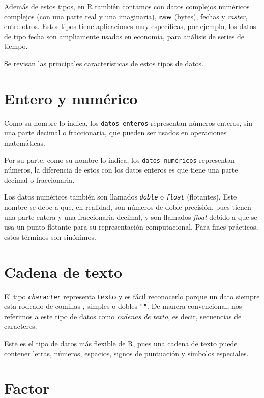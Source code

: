 \documentclass[
]{book}
\begin{document}
Además de estos tipos, en R también contamos con datos complejos numéricos complejos (con una parte real y una imaginaria), \textbf{raw} (bytes), fechas y \emph{raster}, entre otros. Estos tipos tiene aplicaciones muy específicas, por ejemplo, los datos de tipo fecha son ampliamente usados en economía, para análisis de series de tiempo.

Se revisan las principales características de estos tipos de datos.

\hypertarget{entero-y-numuxe9rico}{%
\section{Entero y numérico}\label{entero-y-numuxe9rico}}

Como su nombre lo indica, los \texttt{datos\ enteros} representan números enteros, sin una parte decimal o fraccionaria, que pueden ser usados en operaciones matemáticas.

Por su parte, como su nombre lo indica, los \texttt{datos\ numéricos} representan números, la diferencia de estos con los datos enteros es que tiene una parte decimal o fraccionaria.

Los datos numéricos también son llamados \emph{\texttt{doble}} o \emph{\texttt{float}} (flotantes). Este nombre se debe a que, en realidad, son números de doble precisión, pues tienen una parte entera y una fraccionaria decimal, y son llamados \emph{float} debido a que se usa un punto flotante para su representación computacional. Para fines prácticos, estos términos son sinónimos.

\hypertarget{cadena-de-texto}{%
\section{Cadena de texto}\label{cadena-de-texto}}

El tipo \emph{\texttt{character}} representa \textbf{texto} y es fácil reconocerlo porque un dato siempre esta rodeado de comillas , simples \texttt{\textquotesingle{}\textquotesingle{}} o dobles \texttt{""}. De manera convencional, nos referimos a este tipo de datos como \emph{cadenas de texto}, es decir, secuencias de caracteres.

Este es el tipo de datos más flexible de R, pues una cadena de texto puede contener letras, números, espacios, signos de puntuación y símbolos especiales.

\hypertarget{factor}{%
\section{Factor}\label{factor}}
\end{document}
